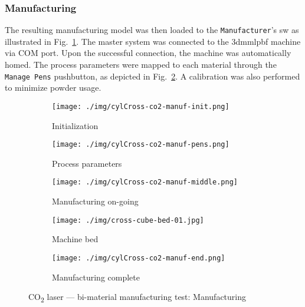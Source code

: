 \subsubsection{Manufacturing}%
\label{sec:manufacturing-co2}
The resulting manufacturing model was then loaded to the \texttt{Manufacturer}'s
\gls{sw} as illustrated in Fig.~\ref{fig:cylCross-co2-manuf-init}. The master system
was connected to the \gls{3dmmlpbf} machine via COM port.
Upon the successful connection, the machine was automatically homed.
The process parameters
were mapped to each material through the \texttt{Manage Pens} pushbutton, as
depicted in Fig.~\ref{fig:cylCross-co2-manuf-pens}.
A calibration was also performed to minimize powder usage.

\begin{figure}[htbp!]
%
  \begin{subfigure}[t]{0.70\textwidth}
    \centering
  \texttt{[image: ./img/cylCross-co2-manuf-init.png]}
  \caption{Initialization}%
  \label{fig:cylCross-co2-manuf-init}
\end{subfigure}
%
  \begin{subfigure}[t]{0.28\textwidth}
  \centering
  \texttt{[image: ./img/cylCross-co2-manuf-pens.png]}
  \caption{Process parameters}%
  \label{fig:cylCross-co2-manuf-pens}
  \end{subfigure}
%
  \begin{subfigure}[t]{.70\textwidth}
  \centering
    \texttt{[image: ./img/cylCross-co2-manuf-middle.png]}
  \caption{Manufacturing on-going}%
  \label{fig:cylCross-co2-manuf-middle}
  \end{subfigure}
%
  \centering
  \begin{subfigure}[t]{.28\textwidth}
    \texttt{[image: ./img/cross-cube-bed-01.jpg]}
  \caption{Machine bed}%
  \label{fig:cylCross-co2-manuf-middle-bed}
  \end{subfigure}
  \centering
  \begin{subfigure}[t]{0.9\textwidth}
    \texttt{[image: ./img/cylCross-co2-manuf-end.png]}
  \caption{Manufacturing complete}%
  \label{fig:cylCross-co2-manuf-end}
  \end{subfigure}
  \caption{CO\textsubscript{2} laser --- bi-material manufacturing test: Manufacturing}%
  \label{fig:cylCross-co2-manuf}
\end{figure}

